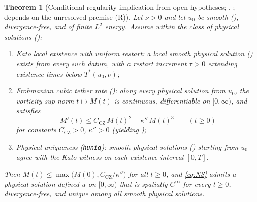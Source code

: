 \documentclass[11pt,a4paper]{article}
\theoremstyle{plain}
\newtheorem{theorem}{Theorem}[section]
\theoremstyle{definition}
\theoremstyle{remark}
\newcommand{\CZ}{C_{\mathrm{CZ}}}
\begin{document}
\begin{theorem}[Conditional regularity implication from open hypotheses; , ; depends on the unresolved premise (R)]\label{thm:main}
Let $\nu>0$ and let $u_0$ be smooth (), divergence-free, and of finite $L^2$ energy. Assume within the class of physical solutions ():
\begin{enumerate}
\item[(K)] \emph{Kato local existence with uniform restart}: a local smooth physical solution () exists from every such datum, with a restart increment $\tau>0$ extending existence times below $T^*(u_0,\nu)$;
\item[(R)] \emph{Frohmanian cubic tether rate ()}: along every physical solution from $u_0$, the vorticity sup-norm $t\mapsto M(t)$ is continuous, differentiable on $[0,\infty)$, and satisfies
\[
M'(t)\le \CZ\,M(t)^2-\kappa''\,M(t)^3\qquad(t\ge 0)
\]
for constants $\CZ>0$, $\kappa''>0$ (yielding );
\item[(U)] \emph{Physical uniqueness (\texttt{huniq})}: smooth physical solutions () starting from $u_0$ agree with the Kato witness on each existence interval $[0,T]$.
\end{enumerate}
Then $M(t)\le\max\bigl(M(0),\CZ/\kappa''\bigr)$ for all $t\ge0$, and \eqref{eq:NS} admits a physical solution defined $u$ on $[0,\infty)$ that is spatially $C^\infty$ for every $t\ge0$, divergence-free, and unique among all smooth physical solutions.
\end{theorem}
\end{document}
